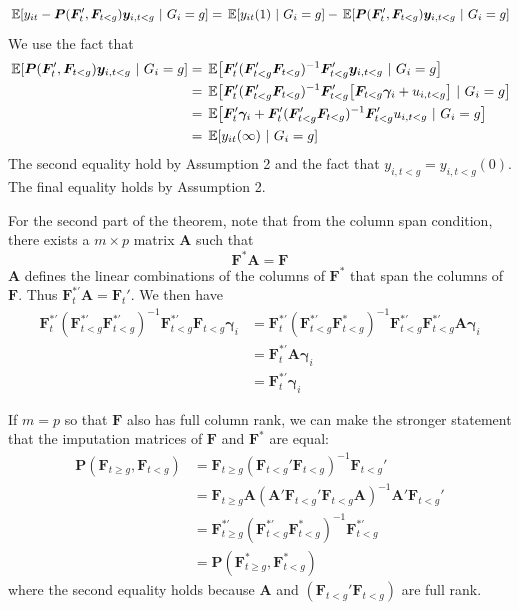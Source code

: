 \documentclass[12pt]{article}
\begin{document}
\begin{equation*}
    \expec{y_{it} - \bm P(\bm{F}_{t}', \bm{F}_{t < g}) \bm y_{i,t < g}}{G_i = g} = \expec{y_{it}(1)}{G_i = g} - \expec{\bm P(\bm{F}_{t}', \bm{F}_{t < g}) \bm y_{i,t < g}}{G_i = g} 
\end{equation*}
We use the fact that 
\begin{align*}
    \expec{ \bm P(\bm{F}_{t}', \bm{F}_{t < g}) \bm y_{i,t < g} }{G_i = g} 
    &= \expec{ \bm{F}_{t}' (\bm{F}_{t < g}' \bm{F}_{t < g})^{-1} \bm{F}_{t < g}' \bm y_{i,t < g} }{G_i = g} \\
    &= \expec{ \bm{F}_{t}' (\bm{F}_{t < g}' \bm{F}_{t < g})^{-1} \bm{F}_{t < g}' \big[\bm{F}_{t < g} \bm \gamma_i + u_{i,t < g} \big] }{G_i = g} \\
    &= \expec{ \bm{F}_{t}' \bm \gamma_i + \bm{F}_{t}' (\bm{F}_{t < g}' \bm{F}_{t < g})^{-1} \bm{F}_{t < g}' u_{i,t < g} }{G_i = g} \\
    &= \expec{ y_{it}(\infty) }{G_i = g} 
\end{align*}
The second equality hold by Assumption 2 and the fact that $y_{i,t < g} = y_{i, t < g}(0)$. The final equality holds by Assumption 2.

For the second part of the theorem, note that from the column span condition, there exists a $m \times p$ matrix $\bm A$ such that 
\begin{equation}
    \bm{F}^*\bm A = \bm{F}
\end{equation}
$\bm A$ defines the linear combinations of the columns of $\bm{F}^*$ that span the columns of $\bm{F}$. Thus $\bm{F}_t^{*'} \bm A = \bm{F}_t'$. We then have
\begin{align*}
    \bm{F}^{*'}_t (\bm{F}^{*'}_{t < g} \bm{F}^{*'}_{t < g})^{-1} \bm{F}^{*'}_{t < g} \bm{F}_{t < g} \bm \gamma_i
    &= \bm{F}^{*'}_t (\bm{F}^{*'}_{t < g} \bm{F}^{*}_{t < g})^{-1} \bm{F}^{*'}_{t < g} \bm{F}^{*'}_{t < g} \bm A \bm \gamma_i \\
    &= \bm{F}^{*'}_t \bm A \bm \gamma_i \\
    &= \bm{F}^{*'}_t \bm \gamma_i
\end{align*}

If $m = p$ so that $\bm{F}$ also has full column rank, we can make the stronger statement that the imputation matrices of $\bm{F}$ and $\bm{F}^{*}$ are equal: 
    \begin{align*}
        \bm P (\bm{F}_{t \geq g}, \bm{F}_{t < g}) 
        &= \bm{F}_{t \geq g} (\bm{F}_{t < g}' \bm{F}_{t < g})^{-1} \bm{F}_{t < g}' \\
        &= \bm{F}_{t \geq g} \bm A (\bm A'\bm{F}_{t < g}' \bm{F}_{t < g} \bm A)^{-1} \bm A' \bm{F}_{t < g}' \\
        &= \bm{F}^{*'}_{t \geq g} (\bm{F}^{*'}_{t < g} \bm{F}^{*}_{t < g})^{-1} \bm{F}^{*'}_{t < g} \\
        &= \bm P(\bm{F}^{*}_{t \geq g}, \bm{F}^{*}_{t < g})
    \end{align*}
    where the second equality holds because $\bm A$ and $(\bm{F}_{t < g}' \bm{F}_{t < g})$ are full rank.
\end{document}
